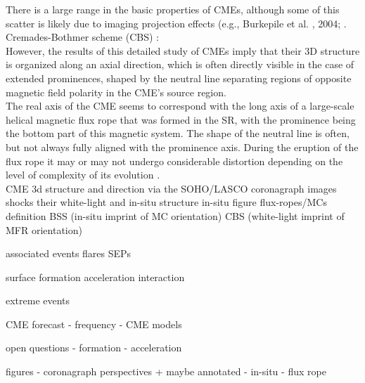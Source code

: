 There is a large range in the basic properties of CMEs, although some of this scatter is likely due to imaging projection effects (e.g., Burkepile et al. , 2004; \citep{Cremades2004}.\\
Cremades-Bothmer scheme (CBS) \citep{Cremades2004}:\\
However, the results of this detailed study of CMEs imply that their 3D structure is organized along an axial direction, which is often directly visible in the case of extended prominences, shaped by the neutral line separating regions of opposite magnetic field polarity in the CME’s source region.\\
The real axis of the CME seems to correspond with the long axis of a large-scale helical magnetic flux rope that was formed in the SR, with the prominence being the bottom part of this magnetic system. The shape of the neutral line is often, but not always fully aligned with the prominence axis. During the eruption of the flux rope it may or may not undergo considerable distortion depending on the level of complexity of its evolution \citep{Cremades2004}.\\

CME 3d structure and direction via the SOHO/LASCO coronagraph images\\




shocks
their white-light and in-situ structure
in-situ figure
flux-ropes/MCs
definition
BSS (in-situ imprint of MC orientation)
CBS (white-light imprint of MFR orientation)

associated events
flares
SEPs

surface formation
acceleration
interaction



extreme events

CME forecast
- frequency
- CME models

open questions
- formation
- acceleration


figures
- coronagraph perspectives + maybe annotated
- in-situ
- flux rope

